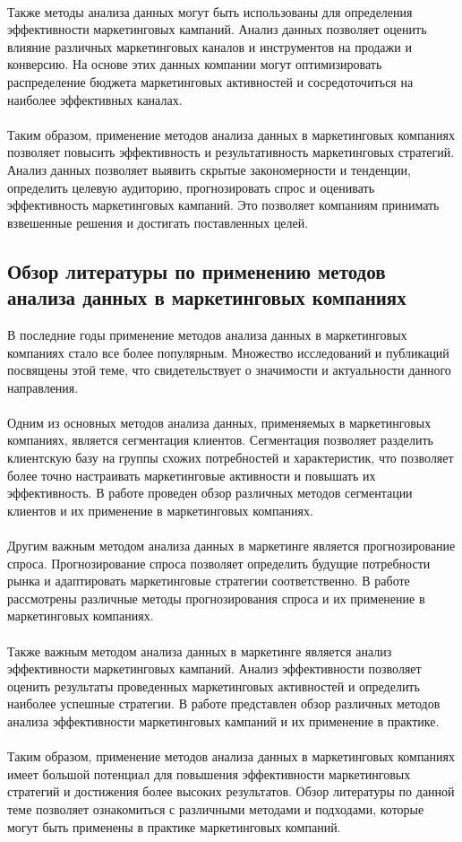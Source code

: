 \documentclass{article}
\begin{document}
~\\
Также методы анализа данных могут быть использованы для определения эффективности маркетинговых кампаний. Анализ данных позволяет оценить влияние различных маркетинговых каналов и инструментов на продажи и конверсию. На основе этих данных компании могут оптимизировать распределение бюджета маркетинговых активностей и сосредоточиться на наиболее эффективных каналах.\\
~\\
Таким образом, применение методов анализа данных в маркетинговых компаниях позволяет повысить эффективность и результативность маркетинговых стратегий. Анализ данных позволяет выявить скрытые закономерности и тенденции, определить целевую аудиторию, прогнозировать спрос и оценивать эффективность маркетинговых кампаний. Это позволяет компаниям принимать взвешенные решения и достигать поставленных целей.
\subsection{Обзор литературы по применению методов анализа данных в маркетинговых компаниях}
В последние годы применение методов анализа данных в маркетинговых компаниях стало все более популярным. Множество исследований и публикаций посвящены этой теме, что свидетельствует о значимости и актуальности данного направления.\\
~\\
Одним из основных методов анализа данных, применяемых в маркетинговых компаниях, является сегментация клиентов. Сегментация позволяет разделить клиентскую базу на группы схожих потребностей и характеристик, что позволяет более точно настраивать маркетинговые активности и повышать их эффективность. В работе \cite{ref1} проведен обзор различных методов сегментации клиентов и их применение в маркетинговых компаниях.\\
~\\
Другим важным методом анализа данных в маркетинге является прогнозирование спроса. Прогнозирование спроса позволяет определить будущие потребности рынка и адаптировать маркетинговые стратегии соответственно. В работе \cite{ref2} рассмотрены различные методы прогнозирования спроса и их применение в маркетинговых компаниях.\\
~\\
Также важным методом анализа данных в маркетинге является анализ эффективности маркетинговых кампаний. Анализ эффективности позволяет оценить результаты проведенных маркетинговых активностей и определить наиболее успешные стратегии. В работе \cite{ref3} представлен обзор различных методов анализа эффективности маркетинговых кампаний и их применение в практике.\\
~\\
Таким образом, применение методов анализа данных в маркетинговых компаниях имеет большой потенциал для повышения эффективности маркетинговых стратегий и достижения более высоких результатов. Обзор литературы по данной теме позволяет ознакомиться с различными методами и подходами, которые могут быть применены в практике маркетинговых компаний.
\end{document}

